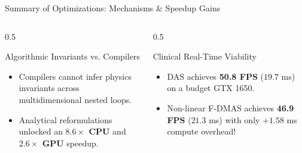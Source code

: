 \documentclass[aspectratio=169,10pt]{beamer}
\begin{document}
\begin{frame}{Summary of Optimizations: Mechanisms \& Speedup Gains}
  \begin{columns}[T]
    \begin{column}{0.5\textwidth}
      \begin{block}{Algorithmic Invariants vs. Compilers}
        \scriptsize
        \begin{itemize}
          \item Compilers cannot infer physics invariants across multidimensional nested loops.
          \item Analytical reformulations unlocked an \textbf{$8.6\times$ CPU} and \textbf{$2.6\times$ GPU} speedup.
        \end{itemize}
      \end{block}
    \end{column}
    \begin{column}{0.5\textwidth}
      \begin{block}{Clinical Real-Time Viability}
        \scriptsize
        \begin{itemize}
          \item DAS achieves \textbf{50.8 FPS} ($19.7$ ms) on a budget GTX 1650.
          \item Non-linear F-DMAS achieves \textbf{46.9 FPS} ($21.3$ ms) with only $+1.58$ ms compute overhead!
        \end{itemize}
      \end{block}
    \end{column}
  \end{columns}
\end{frame}
\end{document}
